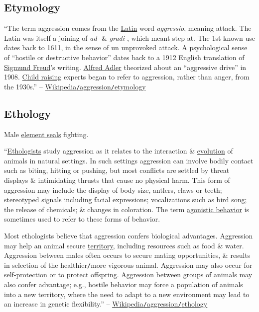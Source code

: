 \documentclass[oneside]{book}
\numberwithin{equation}{section}
\begin{document}
\subsection{Etymology}
``The term aggression comes from the \href{https://en.wikipedia.org/wiki/Latin}{Latin} word \textit{aggressio}, meaning attack. The Latin was itself a joining of \textit{ad-} \& \textit{gradi-}, which meant step at. The 1st known use dates back to 1611, in the sense of un unprovoked attack. A psychological sense of ``hostile or destructive behavior'' dates back to a 1912 English translation of \href{https://en.wikipedia.org/wiki/Sigmund_Freud}{Sigmund Freud}'s writing. \href{https://en.wikipedia.org/wiki/Alfred_Adler}{Alfred Adler} theorized about an ``aggressive drive'' in 1908. \href{https://en.wikipedia.org/wiki/Parenting}{Child raising} experts began to refer to aggression, rather than anger, from the 1930s.'' -- \href{https://en.wikipedia.org/wiki/Aggression#Etymology}{Wikipedia\texttt{/}aggression\texttt{/}etymology}

\subsection{Ethology}
\textsf{Male \href{https://en.wikipedia.org/wiki/Elephant_seal}{element seals} fighting.}

``\href{https://en.wikipedia.org/wiki/Ethology}{Ethologists} study aggression as it relates to the interaction \& \href{https://en.wikipedia.org/wiki/Evolution}{evolution} of animals in natural settings. In such settings aggression can involve bodily contact such as biting, hitting or pushing, but most conflicts are settled by threat displays \& intimidating thrusts that cause no physical harm. This form of aggression may include the display of body size, antlers, claws or teeth; stereotyped signals including facial expressions; vocalizations such as bird song; the release of chemicals; \& changes in coloration. The term \href{https://en.wikipedia.org/wiki/Agonistic_behaviour}{agonistic behavior} is sometimes used to refer to these forms of behavior.

Most ethologists believe that aggression confers biological advantages. Aggression may help an animal secure \href{https://en.wikipedia.org/wiki/Territory_(animal)}{territory}, including resources such as food \& water. Aggression between males often occurs to secure mating opportunities, \& results in selection of the healthier\texttt{/}more vigorous animal. Aggression may also occur for self-protection or to protect offspring. Aggression between groups of animals may also confer advantage; e.g., hostile behavior may force a population of animals into a new territory, where the need to adapt to a new environment may lead to an increase in genetic flexibility.'' -- \href{https://en.wikipedia.org/wiki/Aggression#Ethology}{Wikipedia\texttt{/}aggression\texttt{/}ethology}
\end{document}
